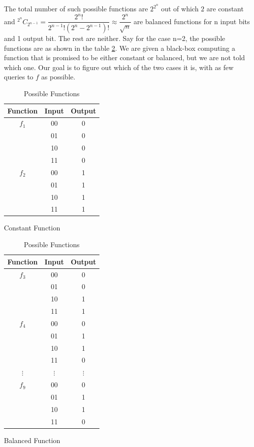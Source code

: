\documentclass[12pt, oneside]{book}
\theoremstyle{definition}
\theoremstyle{definition}
\theoremstyle{remark}
\begin{document}
The total number of such possible functions are $2^{2^n}$ out of which $2$ are constant and $^{2^n}C_{2^{n-1}}= \dfrac{2^n!}{2^{n-1}!(2^n-2^{n-1})!}\approx \dfrac{2^n}{\sqrt{n}}$ are balanced functions for n input bits and 1 output bit. The rest are neither.
Say for the case n=2, the possible functions are as shown in the table \ref{tab:Deutsch-jozsa}. We are given a black-box computing a function that is promised to be either constant or balanced, but we are not told which one. Our goal is to figure out which of the two cases it is, with as few queries to $f$ as possible.
\begin{table}[H]
    \centering
    \begin{subtable}[b]{0.45\linewidth}
        \centering
        \begin{tabular}{|c|c|c|}
            \hline
            Function & Input & Output \\
            \hline
            $f_1$& 00 & 0 \\
            & 01 & 0 \\
            & 10 & 0 \\
            & 11 & 0 \\
            \hline
            $f_2$& 00 & 1 \\
            & 01 & 1 \\
            & 10 & 1 \\
            & 11 & 1 \\
            \hline
        \end{tabular}
        \caption{Constant Function}
    \end{subtable}%
    \begin{subtable}[b]{0.45\linewidth}
        \centering
        \begin{tabular}{|c|c|c|}
            \hline
            Function & Input & Output \\
            \hline
            $f_3$& 00 & 0 \\
            & 01 & 0 \\
            & 10 & 1 \\
            & 11 & 1 \\
            \hline
            $f_4$& 00 & 0 \\
            & 01 & 1 \\
            & 10 & 1 \\
            & 11 & 0 \\
            \hline
            $\vdots$& $\vdots$ & $\vdots$ \\
            \hline
            $f_{9}$ & 00 & 0 \\
            & 01 & 1 \\
            & 10 & 1 \\
            & 11 & 0 \\
            \hline
        \end{tabular}
        \caption{Balanced Function}
    \end{subtable}
    \caption{Possible Functions}
    \label{tab:Deutsch-jozsa}
\end{table}
\end{document}
